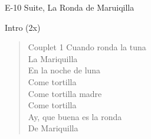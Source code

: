 \begin{song}[vals]{E-10 Suite, La Ronda de Maruiqilla}
\begin{instrumental}{Intro (2x)}
   \\     \measure{}   
\end{instrumental}

\begin{verse}{Couplet 1}
\chord{}Cuando ronda la tuna\\
La Mariquilla\\
\chord{}En la noche de luna\\
Come tortilla\\
\chord{}Come tortilla madre\\
Come tortilla\\
\chord{}Ay, que buena es la ronda\\
De Mariquilla\\
\end{verse}


\end{song}
